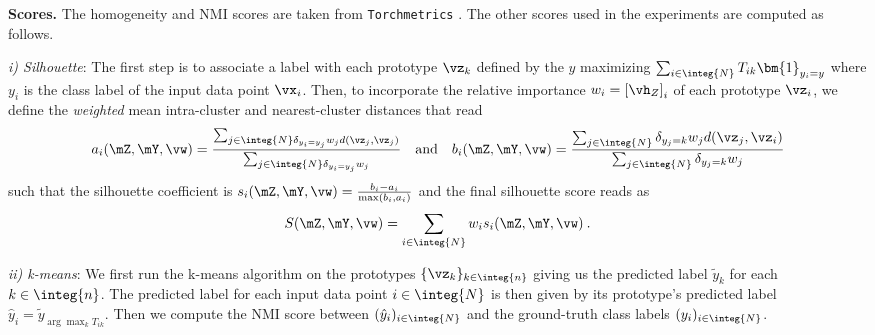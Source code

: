 \begin{table}[h!] \vspace{-5mm}
\centering
\caption{Dataset Sizes.}\label{tab:dataset_details}
\end{table}

\textbf{Scores.} The homogeneity and NMI scores are taken from \texttt{Torchmetrics} \cite{detlefsen2022torchmetrics}. The other scores used in the experiments are computed as follows.

\textit{i) Silhouette}: The first step is to associate a label with each prototype $\vz_k$ defined by the $y$ maximizing $\sum_{i \in \integ{N}} T_{ik} \bm{1}_{y_i = y}$ where $y_i$ is the class label of the input data point $\vx_i$. Then, to incorporate the relative importance $w_i = \left[\vh_Z\right]_i$ of each prototype $\vz_i$, we define the \emph{weighted} mean intra-cluster and nearest-cluster distances that read 
	\begin{equation}
		a_i (\mZ, \mY, \vw)= \frac{\sum_{j\in \integ{N} \delta_{y_i =y_j} w_j d(\vz_j, \vz_j)}}{\sum_{j \in \integ{N} \delta_{y_i = y_j} w_j }} \quad \text{and} \quad b_i (\mZ, \mY, \vw)= \frac{\sum_{j \in \integ{N}} \delta_{y_j = k} w_j d(\vz_j, \vz_i)}{ \sum_{j \in \integ{N}} \delta_{y_j = k}w_j }
	\end{equation}
	such that the silhouette coefficient is $s_i(\mZ, \mY, \vw) = \frac{b_i - a_i}{\max(b_i, a_i)}$ and the final silhouette score reads as
	\begin{equation}
		S(\mZ, \mY, \vw) = \sum_{i \in \integ{N}} w_i s_i(\mZ, \mY, \vw) \:.
	\end{equation}

\textit{ii) k-means}: We first run the k-means algorithm on the prototypes $\{\vz_k\}_{k \in \integ{n}}$ giving us the predicted label $\tilde{y}_k$ for each $k \in \integ{n}$. The predicted label for each input data point $i \in \integ{N}$ is then given by its prototype's predicted label \ie $\hat{y}_i = \tilde{y}_{\arg \max_k T_{ik}}$. Then we compute the NMI score \cite{kvaalseth2017normalized} between $(\hat{y}_i)_{i \in \integ{N}}$ and the ground-truth class labels $(y_i)_{i \in \integ{N}}$.

